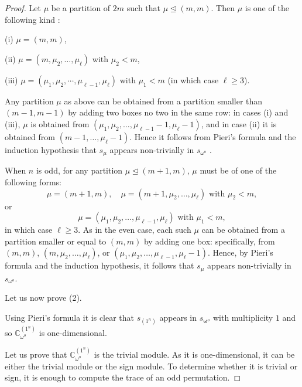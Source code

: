 \documentclass[11pt]{article}
\theoremstyle{definition}
\numberwithin{equation}{section}
\newcommand{\omegahat}{{\boldsymbol \omega}}
\begin{document}
\begin{proof}
	
	Let $\mu$ be a partition of $2m$ such that $\mu\trianglelefteq (m,m)$. Then $\mu$ is one of the following kind :
	
	(i) $\mu=(m,m)$,
	
	(ii)  $\mu=(m,\mu_2,\dots,\mu_\ell)$ with $\mu_2 <m$,
	
	(iii) $\mu=(\mu_1,\mu_2,\cdots,\mu_{\ell-1},\mu_\ell)$ with $\mu_1<m$ (in which case $\ell\geq 3$).
	
	
	
	Any partition $\mu$ as above can be obtained from a partition smaller than $(m-1,m-1)$ by adding two boxes no two in the same row: in cases (i) and (iii), $\mu$ is obtained  from $(\mu_1,\mu_2,\dots,\mu_{\ell-1}-1,\mu_\ell-1)$, and in case (ii) it is obtained from  $(m-1,\dots,\mu_\ell-1)$. Hence it follows from Pieri's formula and the induction hypothesis that $s_\mu$ appears non-trivially in $s_{\omega^o}$ .
	
	
	
	
	When \(n\) is odd, for any partition \(\mu \trianglelefteq (m+1, m)\), \(\mu\) must be of one of the following forms: 
	\[
	\mu = (m+1, m), \quad \mu = (m+1, \mu_2, \dots, \mu_\ell) \text{ with } \mu_2 < m, \]
	or \[  \mu = (\mu_1, \mu_2, \dots, \mu_{\ell-1}, \mu_\ell) \text{ with } \mu_1 < m,
	\]
	in which case \(\ell \geq 3\). 
	As in the even case, each such \(\mu\) can be obtained from a partition smaller or equal to \((m, m)\) by adding one box: specifically, from \((m, m)\), \((m, \mu_2, \dots, \mu_\ell)\), or \((\mu_1, \mu_2, \dots, \mu_{\ell-1}, \mu_\ell - 1)\). 
	Hence, by Pieri’s formula and the induction hypothesis, it follows that \(s_\mu\) appears non-trivially in \(s_{\omega^o}\).
	
	
	
	
	Let us now prove (2).
	
	
	Using Pieri's formula it is clear that $s_{(1^n)}$ appears in $s_{\omegahat^o}$ with multiplicity $1$ and so 
	$\mathbb{C}_{\omega^o}^{(1^n)}$ is one-dimensional.
	
	
	Let us prove that $\mathbb{C}_{\omega^o}^{(1^n)}$ is the trivial module. As it is one-dimensional, it can be either the trivial module or the sign module. 
	To determine whether it is trivial or sign, it is enough to compute the trace of an odd permutation.
	

\end{proof}
\end{document}
